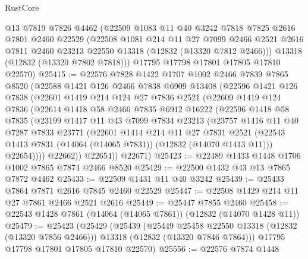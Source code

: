 \begin{lexlean}{RustCore}
\begin{coremodule}
      @13
      @7819
      @7826
      @4462
      (@22509
        @1083
        @11
        @40
        @3242
        @7818
        @7825
        @2616
        @7801
        @2460
        @22529
        (@22508
          @1081
          @214
          @11
          @27
          @7099
          @2466
          @2521
          @2616
          @7811
          @2460
          @23213
          @22550
          @13318
          (@12832 (@13320 @7812 @2466)))
        @13318
        (@12832 (@13320 @7802 @7818)))
      @17795
      @17798
      @17801
      @17805
      @17810
      @22570)
@25415 := @22576
    @7828
    @1422
    @1707
    @1002
    @2466
    @7839
    @7865
    @8520
    (@22588
      @1421
      @126
      @2466
      @7838
      @6909
      @13408
      (@22596
        @1421
        @126
        @7838
        (@22601
          @1419
          @214
          @124
          @27
          @7836
          @2521
          (@22609
            @1419
            @124
            @7836
            (@22614
              @1418
              @58
              @2466
              @7835
              @6912
              @16222
              (@22596
                @1418
                @58
                @7835
                (@23199
                  @1417
                  @11
                  @43
                  @7099
                  @7834
                  @23213
                  (@23757
                    @1416
                    @11
                    @40
                    @7287
                    @7833
                    @23771
                    (@22601
                      @1414
                      @214
                      @11
                      @27
                      @7831
                      @2521
                      (@22543 @1413 @7831 (@14064 (@14065 @7831)) (@12832 (@14070 @1413 @11)))
                      @22654))))
              @22662))
          @22654))
      @22671)
@25423 := @22489 @1433 @1448 @1706 @1002 @7865 @7874 @2466 @8520
@25429 := @22500 @1432 @43 @13 @7865 @7872 @4462
@25433 := @22509 @1431 @11 @40 @3242
@25439 := @25433 @7864 @7871 @2616 @7845 @2460 @22529
@25447 := @22508 @1429 @214 @11 @27 @7861 @2466 @2521 @2616
@25449 := @25447 @7855 @2460
@25458 := @22543 @1428 @7861 (@14064 (@14065 @7861)) (@12832 (@14070 @1428 @11))
@25479 := @25423
    (@25429
      (@25439
        (@25449 @25458 @22550 @13318 (@12832 (@13320 @7856 @2466)))
        @13318
        (@12832 (@13320 @7846 @7864)))
      @17795
      @17798
      @17801
      @17805
      @17810
      @22570)
@25556 := @22576
    @7874
    @1448

\end{coremodule}
\end{lexlean}
